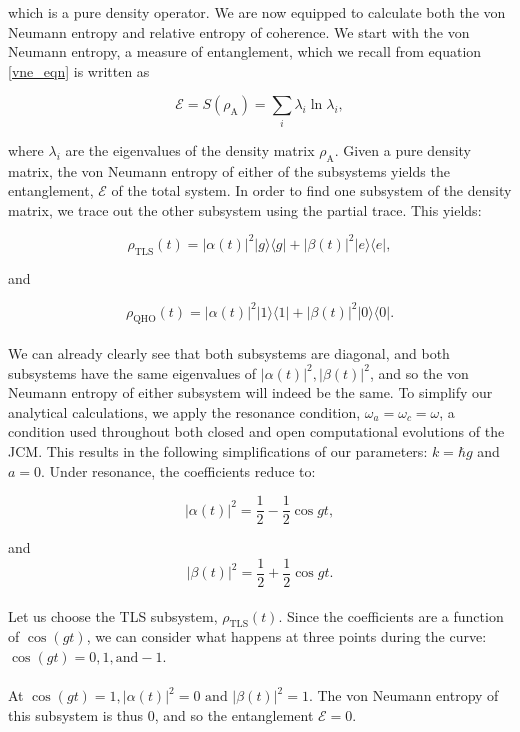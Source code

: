 \documentclass[12pt]{article}
\begin{document}
which is a pure density operator. We are now equipped to calculate both the von Neumann entropy and relative entropy of coherence. We start with the von Neumann entropy, a measure of entanglement, which we recall from equation \eqref{vne_eqn} is written as 

\begin{equation*}
   \mathcal{E} = S(\rho_{\scriptscriptstyle \text{A}}) = \sum_i \lambda_i\ln\lambda_i,
\end{equation*}

where $\lambda_i$ are the eigenvalues of the density matrix $\rho_{\scriptscriptstyle \text{A}}$. Given a pure density matrix, the von Neumann entropy of either of the subsystems yields the entanglement, $\mathcal{E}$ of the total system. In order to find one subsystem of the density matrix, we trace out the other subsystem using the partial trace. This yields:

\begin{equation*}
        \rho_{\scriptscriptstyle \text{TLS}}(t) = |\alpha(t)|^2|g\rangle\langle g| + |\beta(t)|^2 |e\rangle\langle e|,
\end{equation*}

and

\begin{equation} \label{eqn:subsys_JCM_closed}
        \rho_{\scriptscriptstyle \text{QHO}}(t) = |\alpha(t)|^2|1\rangle\langle 1| + |\beta(t)|^2 |0\rangle\langle 0|.
\end{equation}
\\
We can already clearly see that both subsystems are diagonal, and both subsystems have the same eigenvalues of $|\alpha(t)|^2,|\beta(t)|^2$, and so the von Neumann entropy of either subsystem will indeed be the same. To simplify our analytical calculations, we apply the resonance condition, $\omega_a = \omega_c = \omega$, a condition used throughout both closed and open computational evolutions of the JCM. This results in the following simplifications of our parameters: $k = \hbar g$ and $a = 0$. Under resonance, the coefficients reduce to:

\begin{equation*}
    |\alpha(t)|^2 = \frac{1}{2} - \frac{1}{2}\cos gt,
\end{equation*}

and 
\begin{equation} \label{eqn:JCM_complex_coeffs}
    |\beta(t)|^2 = \frac{1}{2} + \frac{1}{2}\cos gt.
\end{equation}
\\
Let us choose the TLS subsystem, $\rho_{\scriptscriptstyle \text{TLS}}(t)$. Since the coefficients are a function of $\cos(gt)$, we can consider what happens at three points during the curve: $\cos(gt) = 0,1, \text{and} -1$.\\
\\
At $\cos(gt) = 1, |\alpha(t)|^2 =0 \text{ and } |\beta(t)|^2 = 1$. The von Neumann entropy of this subsystem is thus $0$, and so the entanglement $\mathcal{E}=0$.
\end{document}

